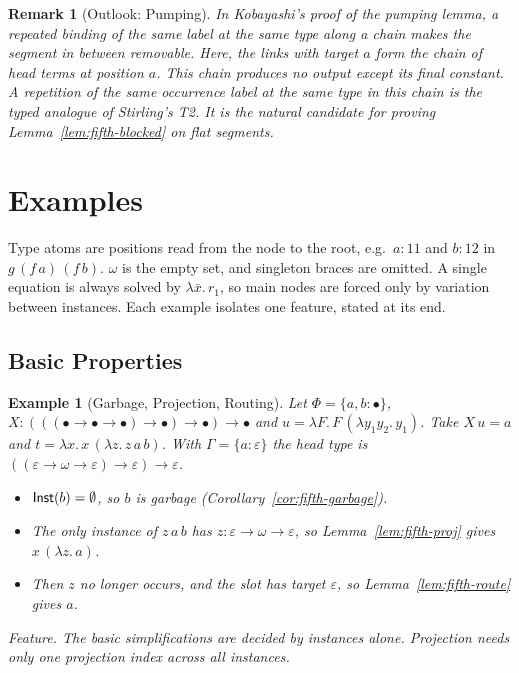 \documentclass[10pt,a4paper]{article}
\theoremstyle{plain}%
\newtheorem{example}[theorem]{Example}
\newtheorem{remark}[theorem]{Remark}
\begin{document}
\begin{remark}[Outlook: Pumping]
In Kobayashi's proof of the pumping lemma, a repeated binding of the same label at the same type along a chain makes the segment in between removable.
Here, the links with target $a$ form the chain of head terms at position $a$.
This chain produces no output except its final constant.
A repetition of the same occurrence label at the same type in this chain is the typed analogue of Stirling's T2.
It is the natural candidate for proving Lemma~\ref{lem:fifth-blocked} on flat segments.
\end{remark}

\section{Examples}
\label{sec:examples}

Type atoms are positions read from the node to the root, e.g.\ $a : 11$ and $b : 12$ in $g\,(f\,a)\,(f\,b)$.
$\omega$ is the empty set, and singleton braces are omitted.
A single equation is always solved by $\lambda\bar x.\,r_1$, so main nodes are forced only by variation between instances.
Each example isolates one feature, stated at its end.

\subsection{Basic Properties}

\begin{example}[Garbage, Projection, Routing]\label{ex:ex-collapse}
Let $\Phi = \{a,b : \bullet\}$, $X : (((\bullet\to\bullet\to\bullet)\to\bullet)\to\bullet)\to\bullet$ and $u = \lambda F.\,F\,(\lambda y_1y_2.\,y_1)$.
Take $X\,u = a$ and $t = \lambda x.\,x\,(\lambda z.\,z\,a\,b)$.
With $\Gamma = \{a : \varepsilon\}$ the head type is $((\varepsilon \to \omega \to \varepsilon) \to \varepsilon) \to \varepsilon$.
\begin{itemize}
\item $\mathsf{Inst}(b) = \emptyset$, so $b$ is garbage (Corollary~\ref{cor:fifth-garbage}).
\item The only instance of $z\,a\,b$ has $z : \varepsilon \to \omega \to \varepsilon$, so Lemma~\ref{lem:fifth-proj} gives $x\,(\lambda z.\,a)$.
\item Then $z$ no longer occurs, and the slot has target $\varepsilon$, so Lemma~\ref{lem:fifth-route} gives $a$.
\end{itemize}

\emph{Feature.}
The basic simplifications are decided by instances alone.
Projection needs only one projection index across all instances.
\end{example}
\end{document}
